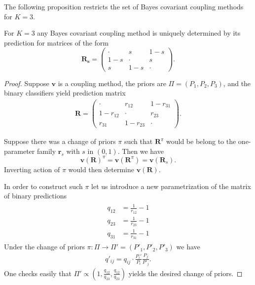 The following proposition restricts the set of Bayes covariant coupling methods for $K=3$.

\begin{prop} \label{prop:bc3}
	For $K=3$ any Bayes covariant coupling method is uniquely determined by its prediction for  matrices of the form
	$$
	\boldsymbol{R_s} = \begin{pmatrix} \cdot & s & 1 -s \\  1-s & \cdot & s \\ s & 1-s & \cdot \end{pmatrix}.
	$$
\end{prop}
\begin{proof}
	Suppose $\boldsymbol{v}$ is a coupling method,  the priors are $\Pi = (P_1, P_2,P_3)$, and the binary classifiers yield prediction matrix 
	\begin{align}
		\boldsymbol{R} = \begin{pmatrix} \cdot & r_{12} & 1 - r_{31} \\ 1-r_{12} & \cdot & r_{23} \\
			r_{31} & 1- r_{23} & \cdot \end{pmatrix}.
	\end{align}
	
	Suppose there was a change of priors $\pi$ such that $\boldsymbol{R}^\pi$ would be belong to the one-parameter family $\boldsymbol{r}_s$ with $s$ in $(0,1)$. Then we have
	$$
	\boldsymbol{v}(\boldsymbol{R})^\pi = \boldsymbol{v}(\boldsymbol{R}^\pi) = \boldsymbol{v}(\boldsymbol{R}_s).
	$$
	Inverting action of $\pi$ would then determine $\boldsymbol{v}(\boldsymbol{R})$.
	
	In order to construct such $\pi$ let us introduce a new parametrization of the matrix of binary  predictions
	\begin{align}
		\begin{split}
			q_{12} &= \frac{1}{r_{12}} -1 \\
			q_{23} &= \frac{1}{r_{23}} -1 \\
			q_{31} &= \frac{1}{r_{31}} -1 
		\end{split}
	\end{align}
	Under the change of priors $\pi:\Pi \rightarrow \Pi' = (P'_1, P'_2, P'_3)$ we have
	\begin{align}
		q'_{ij}	= q_{ij} \cdot \frac{P_i'}{P_i} \frac{P_j}{P'_j}.
	\end{align}
	One checks easily that $\Pi' \propto (1, \frac{q_{12}}{q_{23}}, \frac{q_{12}}{q_{23}})$ yields the desired change of priors.
	
\end{proof}


